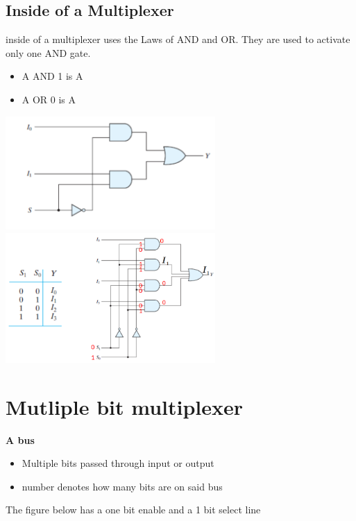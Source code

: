 \documentclass[a4paper,12pt]{article}
\begin{document}
        \subsection{Inside of a Multiplexer}
        inside of a multiplexer uses the Laws of AND and OR. They are used to activate only one AND gate.
        \begin{itemize}
            \item A AND 1 is A
            \item A OR 0 is A
        \end{itemize}
        \includegraphics[width=8cm]{MultiSchem1.png}
        \includegraphics[width=8cm]{4inputmultischem.png}
        
        \section{Mutliple bit multiplexer}
            \textbf{A bus}
            \begin{itemize}
                \item Multiple bits passed through input or output
                \item number denotes how many bits are on said bus    
            \end{itemize}
            The figure below has a one bit enable and a 1 bit select line
\end{document}
